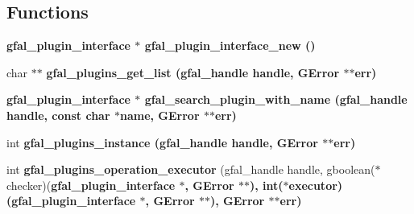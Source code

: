 \subsection*{Functions}
\begin{CompactItemize}
\item 
\bf{gfal\_\-plugin\_\-interface} $\ast$ \bf{gfal\_\-plugin\_\-interface\_\-new} ()
\item 
char $\ast$$\ast$ \bf{gfal\_\-plugins\_\-get\_\-list} (gfal\_\-handle handle, GError $\ast$$\ast$err)
\item 
\bf{gfal\_\-plugin\_\-interface} $\ast$ \bf{gfal\_\-search\_\-plugin\_\-with\_\-name} (gfal\_\-handle handle, const char $\ast$name, GError $\ast$$\ast$err)
\item 
int \bf{gfal\_\-plugins\_\-instance} (gfal\_\-handle handle, GError $\ast$$\ast$err)
\item 
int \textbf{gfal\_\-plugins\_\-operation\_\-executor} (gfal\_\-handle handle, gboolean($\ast$checker)(\bf{gfal\_\-plugin\_\-interface} $\ast$, GError $\ast$$\ast$), int($\ast$executor)(\bf{gfal\_\-plugin\_\-interface} $\ast$, GError $\ast$$\ast$), GError $\ast$$\ast$err)\label{gfal__common__plugin_8c_03cfec9717f9977a6e738574eb1f9ba4}


\end{CompactItemize}
